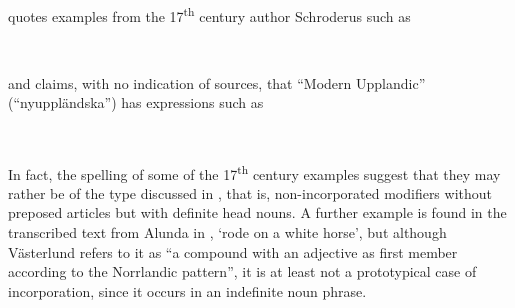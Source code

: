 \citet[523]{Hesselman1908} quotes examples from the 17\textsuperscript{th} century author Schroderus such as

\ea\label{}
\\


\z 
\z 

and claims, with no indication of sources, that “Modern Upplandic” (“nyupp\-ländska”) has expressions such as


\ea\label{}
\\

\z 
\z 

In fact, the spelling of some of the 17\textsuperscript{th} century examples suggest that they may rather be of the type discussed in , that is, non-incorporated modifiers without preposed articles but with definite head nouns. A further example is found in the transcribed text from Alunda in \citet[56]{Västerlund1988},  ‘rode on a white horse’, but although Västerlund refers to it as “a compound with an adjective as first member according to the Norrlandic pattern”, it is at least not a prototypical case of incorporation, since it occurs in an indefinite noun phrase.

